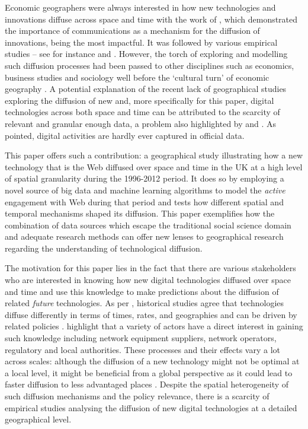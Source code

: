 \documentclass[
  authoryear,
  preprint,
  3p]{elsarticle}
\begin{document}
Economic geographers were always interested in how new technologies and
innovations diffuse across space and time with the work of
\citet{hagerstrand1968innovation}, which demonstrated the importance of
communications as a mechanism for the diffusion of innovations, being
the most impactful. It was followed by various empirical studies -- see
for instance \citet{ormrod1990} and \citet{iso2005}. However, the torch
of exploring and modelling such diffusion processes had been passed to
other disciplines such as economics, business studies and sociology well
before the `cultural turn' of economic geography
\citep{perkins2005international}. A potential explanation of the recent
lack of geographical studies exploring the diffusion of new and, more
specifically for this paper, digital technologies across both space and
time can be attributed to the scarcity of relevant and granular enough
data, a problem also highlighted by \citet{iso2005} and
\citet{kemeny2011international}. As \citet{zook2022mapping} pointed,
digital activities are hardly ever captured in official data.

This paper offers such a contribution: a geographical study illustrating
how a new technology that is the Web diffused over space and time in the
UK at a high level of spatial granularity during the 1996-2012 period.
It does so by employing a novel source of big data and machine learning
algorithms to model the \emph{active} engagement with Web during that
period and tests how different spatial and temporal mechanisms shaped
its diffusion. This paper exemplifies how the combination of data
sources which escape the traditional social science domain and adequate
research methods can offer new lenses to geographical research regarding
the understanding of technological diffusion.

The motivation for this paper lies in the fact that there are various
stakeholders who are interested in knowing how new digital technologies
diffused over space and time and use this knowledge to make predictions
about the diffusion of related \emph{future} technologies. As per
\citet{leibowicz2016representing}, historical studies agree that
technologies diffuse differently in terms of times, rates, and
geographies and can be driven by related policies \citep{victor1993}.
\citet{meade2021modelling} highlight that a variety of actors have a
direct interest in gaining such knowledge including network equipment
suppliers, network operators, regulatory and local authorities. These
processes and their effects vary a lot across scales: although the
diffusion of a new technology might not be optimal at a local level, it
might be beneficial from a global perspective as it could lead to faster
diffusion to less advantaged places \citep{leibowicz2016representing}.
Despite the spatial heterogeneity of such diffusion mechanisms and the
policy relevance, there is a scarcity of empirical studies analysing the
diffusion of new digital technologies at a detailed geographical level.
\end{document}
